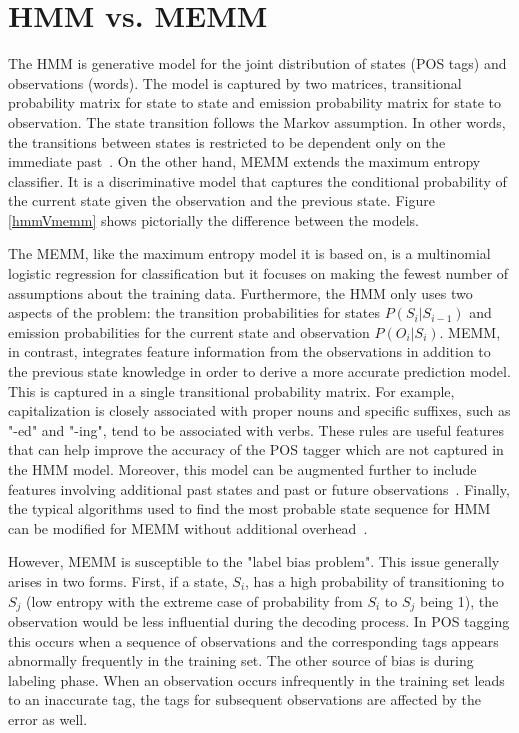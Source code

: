 \section{HMM vs. MEMM}
\label{sec:comparison}

The HMM is generative model for the joint distribution of states (POS tags) and observations (words). The model is captured by two matrices, transitional probability matrix for state to state and emission probability matrix for state to observation. The state transition follows the Markov assumption. In other words, the transitions between states is restricted to be dependent only on the immediate past~\cite{nlpBook}. On the other hand, MEMM extends the maximum entropy classifier. It is a discriminative model that captures the conditional probability of the current state given the observation and the previous state. Figure \ref{hmmVmemm} shows pictorially the difference between the models.

The MEMM, like the maximum entropy model it is based on, is a multinomial logistic regression for classification but it focuses on making the fewest number of assumptions about the training data. Furthermore, the HMM only uses two aspects of the problem: the transition probabilities for states $P( S_i | S_{i-1} )$ and emission probabilities for the current state and observation $P( O_i | S_i )$. MEMM, in contrast, integrates feature information from the observations in addition to the previous state knowledge in order to derive a more accurate prediction model. This is captured in a single transitional probability matrix. For example, capitalization is closely associated with proper nouns and specific suffixes, such as "-ed" and "-ing", tend to be associated with verbs. These rules are useful features that can help improve the accuracy of the POS tagger which are not captured in the HMM model. Moreover, this model can be augmented further to include features involving additional past states and past or future observations~\cite{nlpBook}. Finally, the typical algorithms used to find the most probable state sequence for HMM can be modified for MEMM without additional overhead~\cite{memmPaper}.

However, MEMM is susceptible to the "label bias problem". This issue generally arises in two forms. First, if a state, $S_i$, has a high probability of transitioning to $S_j$ (low entropy with the extreme case of probability from $S_i$ to $S_j$ being 1), the observation would be less influential during the decoding process. In POS tagging this occurs when a sequence of observations and the corresponding tags appears abnormally frequently in the training set. The other source of bias is during labeling phase. When an observation occurs infrequently in the training set leads to an inaccurate tag, the tags for subsequent observations are affected by the error as well. \cite{labelBiasProblem}

